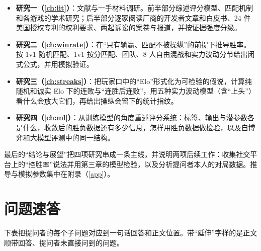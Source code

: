 \begin{itemize}
  \item \textbf{研究一（\cref{ch:lit}）}：文献与一手材料调研。前半部分综述评分模型、匹配机制和各游戏的学术研究；后半部分逐家阅读厂商的开发者文章和白皮书、24 件美国授权专利的权利要求、两起诉讼的案卷与报道，并按证据强度分级。
  \item \textbf{研究二（\cref{ch:winrate}）}：在“只有输赢、匹配不被操纵”的前提下推导胜率。按 1v1 随机匹配、1v1 按分匹配、团队、8 人自由混战和实力波动分节给出闭式公式，并用模拟验证。
  \item \textbf{研究三（\cref{ch:streaks}）}：把玩家口中的“Elo”形式化为可检验的假说，计算纯随机和诚实 Elo 下的连败与“连胜后连败”，用五种实力波动模型（含“上头”）看什么会放大它们，再给出操纵会留下的统计指纹。
  \item \textbf{研究四（\cref{ch:ml}）}：从训练模型的角度重述评分系统：标签、输出与潜参数各是什么，收敛后的胜负数据还有多少信息，怎样用胜负数据做检验，以及自博弈和大模型评测中的同一结构。
\end{itemize}

最后的“结论与展望”把四项研究串成一条主线，并说明两项后续工作：收集社交平台上的“控胜率”说法并用第三章的模型检验，以及分析提问者本人的对局数据。推导与模拟参数集中在附录（\cref{app}）。

\section*{问题速答}
\label{sec:intro-qa}

下表把提问者的每个子问题对应到一句话回答和正文位置。带“延伸”字样的是正文顺带回答、提问者未直接问到的问题。

